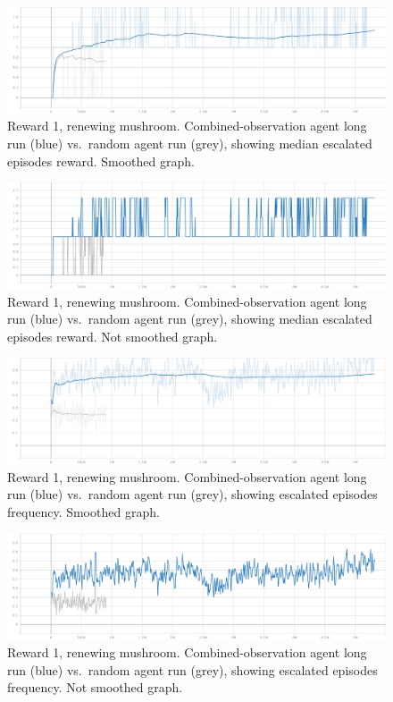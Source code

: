 \documentclass[]{article}
\begin{document}
\begin{figure}
\centering
\includegraphics{./img/114091992-adf7c500-98b9-11eb-9bd1-6572f706ce9e.png}
\caption{Reward 1, renewing mushroom. Combined-observation agent long
run (blue) vs.~random agent run (grey), showing median escalated
episodes reward. Smoothed graph.}
\end{figure}

\begin{figure}
\centering
\includegraphics{./img/114092068-c071fe80-98b9-11eb-8806-7ce21effd1da.png}
\caption{Reward 1, renewing mushroom. Combined-observation agent long
run (blue) vs.~random agent run (grey), showing median escalated
episodes reward. Not smoothed graph.}
\end{figure}

\begin{figure}
\centering
\includegraphics{./img/114084845-e941c600-98b0-11eb-92ac-cf469b25d135.png}
\caption{Reward 1, renewing mushroom. Combined-observation agent long
run (blue) vs.~random agent run (grey), showing escalated episodes
frequency. Smoothed graph.}
\end{figure}

\begin{figure}
\centering
\includegraphics{./img/114084866-ef37a700-98b0-11eb-88e4-a81ebb4dae53.png}
\caption{Reward 1, renewing mushroom. Combined-observation agent long
run (blue) vs.~random agent run (grey), showing escalated episodes
frequency. Not smoothed graph.}
\end{figure}
\end{document}
